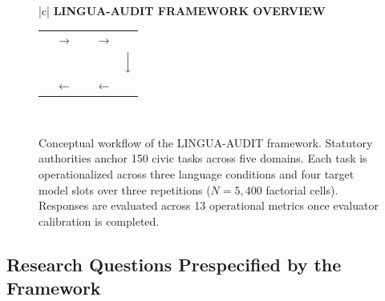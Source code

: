\documentclass[11pt,a4paper]{article}
\begin{document}
\begin{figure}[htbp]
\centering
\small
\begin{tabular}{|c|}
\hline
\textbf{LINGUA-AUDIT FRAMEWORK OVERVIEW} \\[0.5em]
\begin{tabular}{ccccc}
\fbox{\parbox{3.6cm}{\centering \textbf{Statutory Authorities}\\ (Acts, Portals, Rules)}}
& $\longrightarrow$ &
\fbox{\parbox{3.6cm}{\centering \textbf{150 Benchmark Tasks}\\ (5 Civic Domains)}}
& $\longrightarrow$ &
\fbox{\parbox{3.6cm}{\centering \textbf{3 Language Prompts}\\ (EN, HI, Hinglish)}} \\
& & & & $\Big\downarrow$ \\
\fbox{\parbox{3.6cm}{\centering \textbf{13 Operational Metrics}\\ (Precision, Omission,\\ Safety, Consistency)}}
& $\longleftarrow$ &
\fbox{\parbox{3.8cm}{\centering \textbf{Automated Evaluator}\\ Protocol (Specified;\\ Validation PENDING)}}
& $\longleftarrow$ &
\fbox{\parbox{3.6cm}{\centering \textbf{4 Target LLM Slots}\\ (5,400 Factorial\\ Pipeline Matrix)}}
\end{tabular} \\[1em]
\hline
\end{tabular}
\caption{Conceptual workflow of the LINGUA-AUDIT framework. Statutory authorities anchor 150 civic tasks across five domains. Each task is operationalized across three language conditions and four target model slots over three repetitions ($N=5{,}400$ factorial cells). Responses are evaluated across 13 operational metrics once evaluator calibration is completed.}
\label{fig:framework_overview}
\end{figure}

\subsection{Research Questions Prespecified by the Framework}
\label{sec:rqs}
\end{document}
